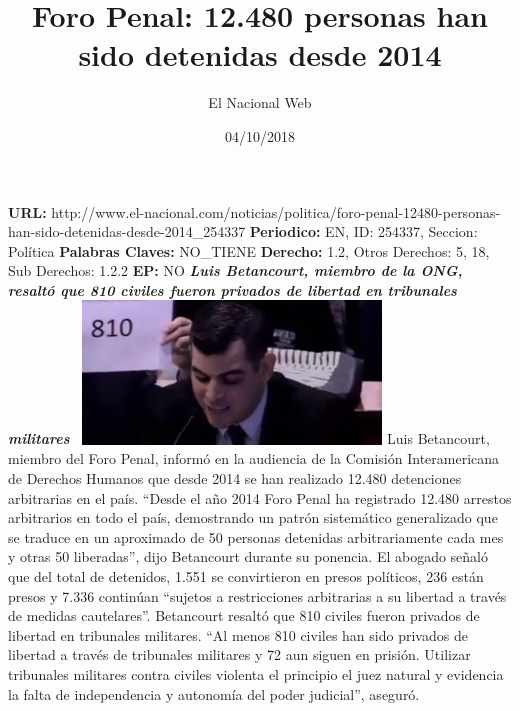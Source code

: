 \documentclass{article}%
\title{\textbf{Foro Penal: 12.480 personas han sido detenidas desde 2014}}%
\author{El Nacional Web}%
\date{04/10/2018}%
\begin{document}
%
\normalsize%
\maketitle%
\textbf{URL: }%
http://www.el{-}nacional.com/noticias/politica/foro{-}penal{-}12480{-}personas{-}han{-}sido{-}detenidas{-}desde{-}2014\_254337\newline%
%
\textbf{Periodico: }%
EN, %
ID: %
254337, %
Seccion: %
Política\newline%
%
\textbf{Palabras Claves: }%
NO\_TIENE\newline%
%
\textbf{Derecho: }%
1.2, %
Otros Derechos: %
5, 18, %
Sub Derechos: %
1.2.2\newline%
%
\textbf{EP: }%
NO\newline%
\newline%
%
\textbf{\textit{Luis Betancourt, miembro de la ONG, resaltó que 810 civiles fueron privados de libertad en tribunales militares~}}%
\newline%
\newline%
%
\includegraphics[width=300px]{161.jpg}%
\newline%
%
Luis Betancourt, miembro del Foro Penal, informó en la audiencia de la Comisión Interamericana de Derechos Humanos que desde 2014 se han realizado 12.480 detenciones arbitrarias en el país.%
\newline%
%
“Desde el año 2014 Foro Penal ha registrado 12.480 arrestos arbitrarios en todo el país, demostrando un patrón sistemático generalizado que se traduce en un aproximado de 50 personas detenidas arbitrariamente cada mes y otras 50 liberadas”, dijo Betancourt durante su ponencia.%
\newline%
%
El abogado señaló que del total de detenidos, 1.551 se convirtieron en presos políticos, 236 están presos y 7.336 continúan “sujetos a restricciones arbitrarias a su libertad a través de medidas cautelares”.%
\newline%
%
Betancourt resaltó que 810 civiles fueron privados de libertad en tribunales militares.%
\newline%
%
“Al menos 810 civiles han sido privados de libertad a través de tribunales militares y 72 aun siguen en prisión. Utilizar tribunales militares contra civiles violenta el principio el juez natural y evidencia la falta de independencia y autonomía del poder judicial”, aseguró.%
\newline%
%
\end{document}
